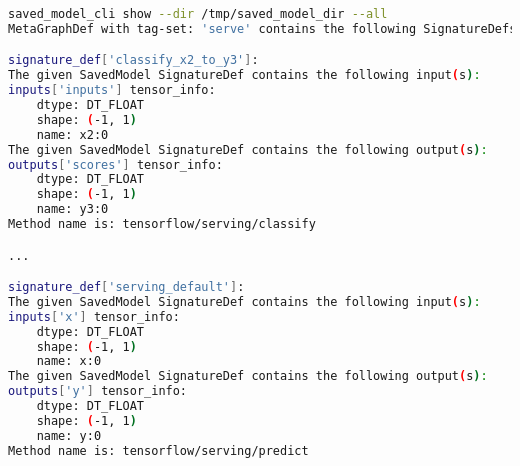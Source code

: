 \begin{lstlisting}[language=Bash]
saved_model_cli show --dir /tmp/saved_model_dir --all
MetaGraphDef with tag-set: 'serve' contains the following SignatureDefs:

signature_def['classify_x2_to_y3']:
The given SavedModel SignatureDef contains the following input(s):
inputs['inputs'] tensor_info:
    dtype: DT_FLOAT
    shape: (-1, 1)
    name: x2:0
The given SavedModel SignatureDef contains the following output(s):
outputs['scores'] tensor_info:
    dtype: DT_FLOAT
    shape: (-1, 1)
    name: y3:0
Method name is: tensorflow/serving/classify

...

signature_def['serving_default']:
The given SavedModel SignatureDef contains the following input(s):
inputs['x'] tensor_info:
    dtype: DT_FLOAT
    shape: (-1, 1)
    name: x:0
The given SavedModel SignatureDef contains the following output(s):
outputs['y'] tensor_info:
    dtype: DT_FLOAT
    shape: (-1, 1)
    name: y:0
Method name is: tensorflow/serving/predict
\end{lstlisting}

